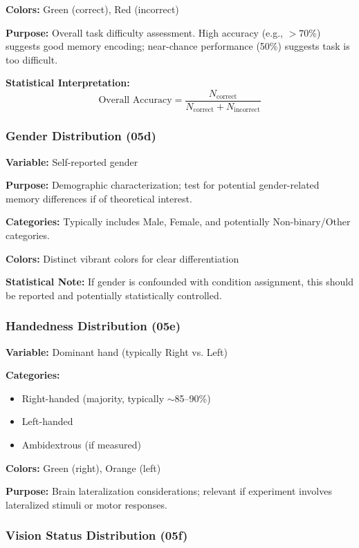 \documentclass[12pt,a4paper]{article}
\begin{document}
\textbf{Colors:} Green (correct), Red (incorrect)

\textbf{Purpose:} Overall task difficulty assessment. High accuracy (e.g., $>70\%$) suggests good memory encoding; near-chance performance (50\%) suggests task is too difficult.

\textbf{Statistical Interpretation:}
\begin{equation}
\text{Overall Accuracy} = \frac{N_{\text{correct}}}{N_{\text{correct}} + N_{\text{incorrect}}}
\end{equation}

\subsubsection{Gender Distribution (05d)}

\textbf{Variable:} Self-reported gender

\textbf{Purpose:} Demographic characterization; test for potential gender-related memory differences if of theoretical interest.

\textbf{Categories:} Typically includes Male, Female, and potentially Non-binary/Other categories.

\textbf{Colors:} Distinct vibrant colors for clear differentiation

\textbf{Statistical Note:} If gender is confounded with condition assignment, this should be reported and potentially statistically controlled.

\subsubsection{Handedness Distribution (05e)}

\textbf{Variable:} Dominant hand (typically Right vs. Left)

\textbf{Categories:}
\begin{itemize}
    \item Right-handed (majority, typically $\sim$85--90\%)
    \item Left-handed
    \item Ambidextrous (if measured)
\end{itemize}

\textbf{Colors:} Green (right), Orange (left)

\textbf{Purpose:} Brain lateralization considerations; relevant if experiment involves lateralized stimuli or motor responses.

\subsubsection{Vision Status Distribution (05f)}
\end{document}
